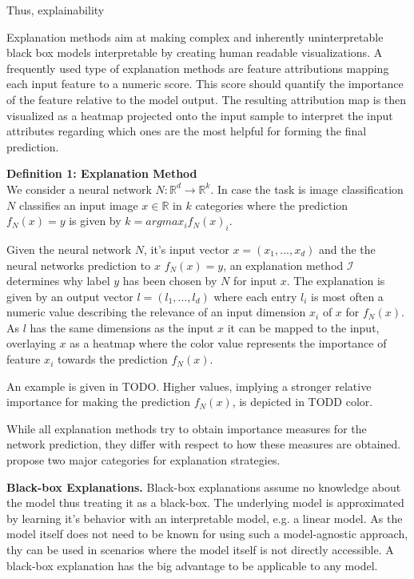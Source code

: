 Thus, explainability 


Explanation methods aim at making complex and inherently uninterpretable black box models interpretable by creating human readable visualizations. 
A frequently used type of explanation methods are feature attributions mapping each input feature to a numeric score. This score should quantify the importance of the feature relative to the model output. The resulting attribution map is then visualized as a heatmap projected onto the input sample to interpret the input attributes regarding which ones are the most helpful for forming the final prediction. 

\textbf{Definition 1: Explanation Method}\\
We consider a neural network $N: \mathbb{R}^d \to \mathbb{R}^k$. In case the task is image classification $N$ classifies an input image $x\in  \mathbb{R}$ in $k$ categories where the prediction $f_N(x)=y$ is given by $k= arg max_i f_N(x)_i$.

Given the neural network $N$, it's input vector $x=(x_1, ..., x_d)$ and the the neural networks prediction to $x$ $f_N(x)=y$, an explanation method $\mathcal{I}$ determines why label $y$ has been chosen by $N$ for input $x$. The explanation is given by an output vector $l=(l_1, ..., l_d)$ where each entry $l_i$ is most often a numeric value describing the relevance of an input dimension $x_i$ of $x$ for $f_N(x)$. 
As $l$ has the same dimensions as the input $x$ it can be mapped to the input, overlaying $x$ as a heatmap where the color value represents the importance of feature $x_i$ towards the prediction $f_N(x)$.

An example is given in TODO. Higher values, implying a stronger relative importance for making the prediction $f_N(x)$, is depicted in TODD color. 



While all explanation methods try to obtain importance measures for the network prediction, they differ with respect to how these measures are obtained. 
\cite{evaluating_explanations_security} propose two major categories for explanation strategies.

\noindent\textbf{Black-box Explanations.} Black-box explanations assume no knowledge about the model thus treating it as a black-box. The underlying model is approximated by learning it's behavior with an interpretable model, e.g. a linear model. As the model itself does not need to be known for using such a model-agnostic approach, thy can be used in scenarios where the model itself is not directly accessible. A black-box explanation has the big advantage to be applicable to any model.


